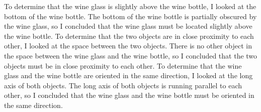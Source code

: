 \begin{enumerate}
{        To determine that the wine glass is slightly above the wine bottle, I looked at the bottom of the wine bottle. The bottom of the wine bottle is partially obscured by the wine glass, so I concluded that the wine glass must be located slightly above the wine bottle.
        To determine that the two objects are in close proximity to each other, I looked at the space between the two objects. There is no other object in the space between the wine glass and the wine bottle, so I concluded that the two objects must be in close proximity to each other.
        To determine that the wine glass and the wine bottle are oriented in the same direction, I looked at the long axis of both objects. The long axis of both objects is running parallel to each other, so I concluded that the wine glass and the wine bottle must be oriented in the same direction.}
    \end{enumerate}

